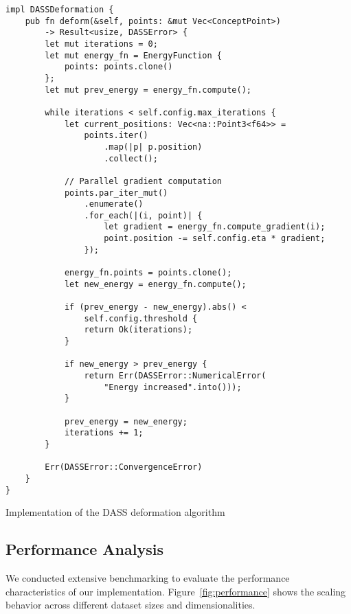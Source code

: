 \documentclass{article}
\begin{document}
\begin{listing}[h]
\begin{verbatim}
impl DASSDeformation {
    pub fn deform(&self, points: &mut Vec<ConceptPoint>) 
        -> Result<usize, DASSError> {
        let mut iterations = 0;
        let mut energy_fn = EnergyFunction { 
            points: points.clone() 
        };
        let mut prev_energy = energy_fn.compute();
        
        while iterations < self.config.max_iterations {
            let current_positions: Vec<na::Point3<f64>> = 
                points.iter()
                    .map(|p| p.position)
                    .collect();
            
            // Parallel gradient computation
            points.par_iter_mut()
                .enumerate()
                .for_each(|(i, point)| {
                    let gradient = energy_fn.compute_gradient(i);
                    point.position -= self.config.eta * gradient;
                });
            
            energy_fn.points = points.clone();
            let new_energy = energy_fn.compute();
            
            if (prev_energy - new_energy).abs() < 
                self.config.threshold {
                return Ok(iterations);
            }
            
            if new_energy > prev_energy {
                return Err(DASSError::NumericalError(
                    "Energy increased".into()));
            }
            
            prev_energy = new_energy;
            iterations += 1;
        }
        
        Err(DASSError::ConvergenceError)
    }
}
\end{verbatim}
\caption{Implementation of the DASS deformation algorithm}
\label{lst:deformation-impl}
\end{listing}

\subsection{Performance Analysis}
We conducted extensive benchmarking to evaluate the performance characteristics of our implementation. Figure~\ref{fig:performance} shows the scaling behavior across different dataset sizes and dimensionalities.
\end{document}

